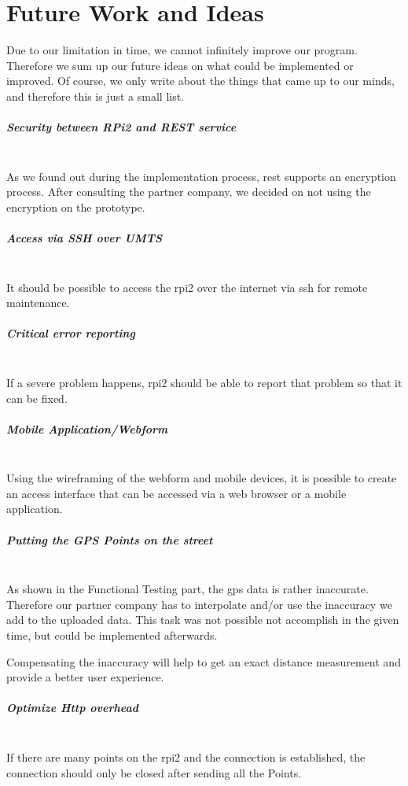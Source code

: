 \chapter{Future Work and Ideas}
Due to our limitation in time, we cannot infinitely improve our program. Therefore we sum up our future ideas on what could be implemented or improved. Of course, we only write about the things that came up to our minds, and therefore this is just a small list.
\paragraph{Security between RPi2 and REST service}\mbox{}\\
As we found out during the implementation process, \gls{rest} supports an encryption process. After consulting the partner company, we decided on not using the encryption on the prototype.
\paragraph{Access via SSH over UMTS}\mbox{}\\
It should be possible to access the \gls{rpi2} over the internet via \gls{ssh} for remote maintenance.
\paragraph{Critical error reporting}\mbox{}\\
If a severe problem happens, \gls{rpi2} should be able to report that problem so that it can be fixed.
\paragraph{Mobile Application/Webform}\mbox{}\\
Using the wireframing of the webform and mobile devices, it is possible to create an access interface that can be accessed via a web browser or a mobile application.
\paragraph{Putting the GPS Points on the street}\mbox{}\\
As shown in the Functional Testing part, the \gls{gps} data is rather inaccurate. Therefore our partner company has to interpolate and/or use the inaccuracy we add to the uploaded data. This task was not possible not accomplish in the given time, but could be implemented afterwards.

Compensating the inaccuracy will help to get an exact distance measurement and provide a better user experience.
\paragraph{Optimize Http overhead}\mbox{}\\
If there are many points on the \gls{rpi2}  and the connection is established, the connection should only be closed after sending all the Points.
